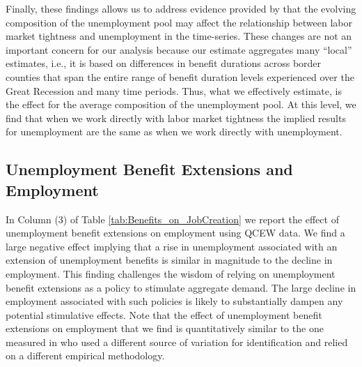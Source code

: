 \documentclass[12pt]{article}
\newcommand{\1}{\mathbf{1}}
\begin{document}
Finally, these findings allows us to address evidence provided by \citet{ahn+hamilton:18} that the evolving composition of the unemployment pool may affect the relationship between labor market tightness and unemployment in the time-series. These changes are not an important concern for our analysis because our estimate aggregates many ``local'' estimates, i.e., it is based on differences in benefit durations across border counties that span the entire range of benefit duration levels experienced over the Great Recession and many time periods. Thus, what we effectively estimate, is the effect for the average composition of the unemployment pool. At this level, we find that when we work directly with labor market tightness the implied results for unemployment are the same as when we work directly with unemployment.



\subsection{Unemployment Benefit Extensions and Employment}
\label{sec:UI_and_Emp}
In Column (3) of Table \ref{tab:Benefits_on_JobCreation} we report the effect of unemployment benefit extensions on employment using QCEW data. We find a large negative effect implying that a rise in unemployment associated with an extension of unemployment benefits is similar in magnitude to the decline in employment. This finding challenges the wisdom of relying on unemployment benefit extensions as a policy to stimulate aggregate demand. The large decline in employment associated with such policies is likely to substantially dampen any potential stimulative effects. Note that the effect of unemployment benefit extensions on employment that we find is quantitatively similar to the one measured in \citet{hagedorn+manovskii+mitman:15} who used a different source of variation for identification and relied on a different empirical methodology.
\end{document}
